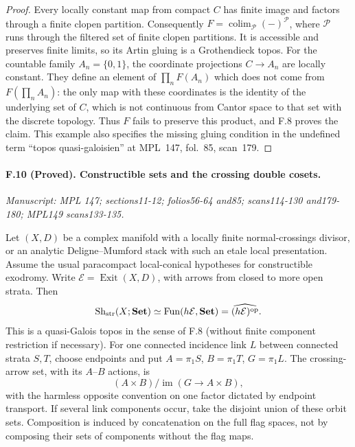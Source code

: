 \begin{proof}
Every locally constant map from compact $C$ has finite image and factors
through a finite clopen partition. Consequently
$F=\operatorname*{colim}_{\mathcal P}(-)^{\mathcal P}$, where
$\mathcal P$ runs through the filtered set of finite clopen partitions.
It is accessible and preserves finite limits, so its Artin gluing is a
Grothendieck topos. For the countable family $A_n=\{0,1\}$, the coordinate
projections $C\to A_n$ are locally constant. They define an element of
$\prod_nF(A_n)$ which does not come from $F(\prod_n A_n)$: the only map
with these coordinates is the identity of the underlying set of $C$,
which is not continuous from Cantor space to that set with the discrete
topology. Thus $F$ fails to preserve this product, and F.8 proves the
claim. This example also specifies the missing gluing condition in the
undefined term ``topos quasi-galoisien'' at MPL~147, fol.~85, scan~179.
\end{proof}

\paragraph{F.10 (Proved). Constructible sets and the crossing double cosets.}
\textit{Manuscript: MPL 147; sections11-12; folios56-64 and85; scans114-130 and179-180; MPL149 scans133-135.}

Let $(X,D)$ be a complex manifold with a locally finite normal-crossings
divisor, or an analytic Deligne--Mumford stack with such an etale local
presentation. Assume the usual paracompact local-conical hypotheses for
constructible exodromy. Write $\mathcal E=\operatorname{Exit}(X,D)$,
with arrows from closed to more open strata. Then
\[
 \operatorname{Sh}_{\rm str}(X;\mathbf{Set})
       \simeq\operatorname{Fun}(h\mathcal E,\mathbf{Set})
       =\widehat{(h\mathcal E)^{\rm op}}.
\]
This is a quasi-Galois topos in the sense of F.8 (without finite component
restriction if necessary). For one connected incidence link $L$ between
connected strata $S,T$, choose endpoints and put
$A=\pi_1S$, $B=\pi_1T$, $G=\pi_1L$. The crossing-arrow set, with its
$A$--$B$ actions, is
\[
             (A\times B)/\operatorname{im}(G\to A\times B),
\]
with the harmless opposite convention on one factor dictated by endpoint
transport. If several link components occur, take the disjoint union of
these orbit sets. Composition is induced by concatenation on the full
flag spaces, not by composing their sets of components without the flag
maps.


